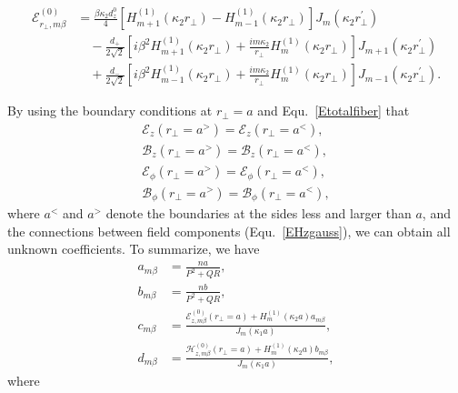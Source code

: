 \documentclass[preprint,aps,pra,onecolumn]{revtex4-1} %
\begin{document}
\begin{align}
\mathcal{E}_{r\!_\perp,m\beta}^{(0)} 
&= \frac{\beta \kappa_2d^0_z}{4}\left[ H^{(1)}_{m+1}\!\left( \kappa_2r\!_\perp \right)-H^{(1)}_{m-1}\!\left( \kappa_2r_\perp \right)\right] J_m\left( {\kappa_2r\!_\perp^{\prime} }\right)\nonumber\\ 
&\quad -\frac{d_+}{2\sqrt{2}}\left[ i\beta^2H^{(1)}_{m+1}\!\left( \kappa_2r_\perp \right) +\frac{im\kappa_2}{r\!_\perp}H^{(1)}_m\!\left( \kappa_2r_\perp \right)\right] J_{m+1}\!\left( {\kappa_2r\!_\perp^{\prime} }\right)\nonumber\\
&\quad + \frac{d_-}{2\sqrt{2}}\left[ i\beta^2H^{(1)}_{m-1}\!\left( \kappa_2r_\perp \right) +\frac{im\kappa_2}{r\!_\perp}H^{(1)}_m\!\left( \kappa_2r_\perp \right)\right] J_{m-1}\!\left( {\kappa_2r\!_\perp^{\prime} }\right).
\end{align}

By using the boundary conditions at $ r\!_\perp=a $ and Equ.~\eqref{Etotalfiber} that
\begin{align}
\mathcal{E}_{z}(r\!_\perp =a^> ) = \mathcal{E}_{z}(r\!_\perp =a^< ),\\
\mathcal{B}_{z}(r\!_\perp =a^> ) = \mathcal{B}_{z}(r\!_\perp =a^< ),\\
\mathcal{E}_{\phi}(r\!_\perp =a^> ) = \mathcal{E}_{\phi}(r\!_\perp =a^< ),\\
\mathcal{B}_{\phi}(r\!_\perp =a^> ) = \mathcal{B}_{\phi}(r\!_\perp =a^< ),
\end{align}
where $ a^< $ and $ a^> $ denote the boundaries at the sides less and larger than $ a $, and the connections between field components (Equ.~\eqref{EHzgauss}), we can obtain all unknown coefficients. To summarize, we have~\cite{Klimov2004}
\begin{align}
a_{m\beta} &= \frac{na}{P^2+QR},\\
b_{m\beta} &= \frac{nb}{P^2+QR},\\
c_{m\beta} &= \frac{\mathcal{E}_{z,m\beta}^{(0)}(r\!_\perp\!=\!a)+ H_m^{(1)}(\kappa_2a)a_{m\beta}}{J_m(\kappa_1a)},\\
d_{m\beta} &= \frac{\mathcal{H}_{z,m\beta}^{(0)}(r\!_\perp\!=\!a)+ H_m^{(1)}(\kappa_2a)b_{m\beta}}{J_m(\kappa_1a)},
\end{align}
where
\end{document}
